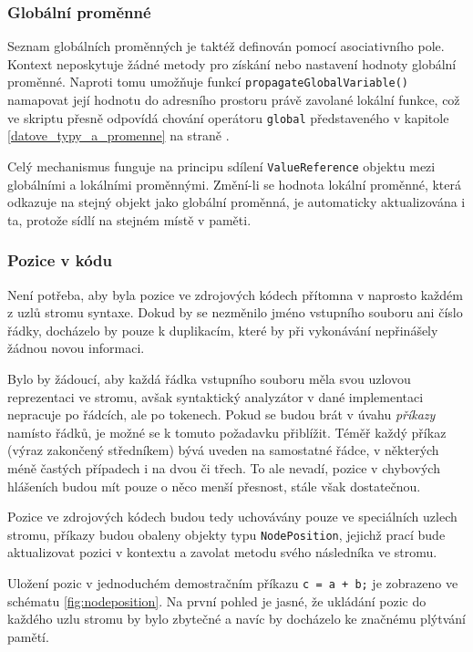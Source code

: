 \documentclass[11pt,twoside,a4paper]{book}
\begin{document}
\subsubsection{Globální proměnné}

Seznam globálních proměnných je taktéž definován pomocí asociativního pole. Kontext neposkytuje žádné metody pro získání nebo nastavení hodnoty globální proměnné. Naproti tomu umožňuje funkcí \texttt{propagateGlobalVariable()} namapovat její hodnotu do adresního prostoru právě zavolané lokální funkce, což ve skriptu přesně odpovídá chování operátoru \texttt{global} představeného v kapitole \ref{datove_typy_a_promenne} na straně \pageref{datove_typy_a_promenne}.

Celý mechanismus funguje na principu sdílení \texttt{ValueReference} objektu mezi globálními a lo\-kál\-ní\-mi proměnnými. Změní-li se hodnota lokální proměnné, která odkazuje na stejný objekt jako globální proměnná, je automaticky aktualizována i ta, protože sídlí na stejném místě v paměti.


\subsubsection{Pozice v kódu}
\label{pozice_v_kodu}

Není potřeba, aby byla pozice ve zdrojových kódech přítomna v naprosto každém z uzlů stromu syntaxe. Dokud by se nezměnilo jméno vstupního souboru ani číslo řádky, docházelo by pouze k duplikacím, které by při vykonávání nepřinášely žádnou novou informaci.

Bylo by žádoucí, aby každá řádka vstupního souboru měla svou uzlovou reprezentaci ve stromu, avšak syntaktický analyzátor v dané implementaci nepracuje po řádcích, ale po tokenech. Pokud se budou brát v úvahu \textit{příkazy} namísto řádků, je možné se k tomuto požadavku přiblížit. Téměř každý příkaz (výraz zakončený středníkem) bývá uveden na samostatné řádce, v některých méně častých případech i na dvou či třech. To ale nevadí, pozice v chybových hlášeních budou mít pouze o něco menší přesnost, stále však dostatečnou.

Pozice ve zdrojových kódech budou tedy uchovávány pouze ve speciálních uzlech stromu, příkazy budou obaleny objekty typu \texttt{NodePosition}, jejichž prací bude aktualizovat pozici v kontextu a zavolat metodu svého ná\-sled\-ní\-ka ve stromu.

Uložení pozic v jednoduchém demostračním příkazu \texttt{c = a + b;} je zobrazeno ve schématu \ref{fig:nodeposition}. Na první pohled je jasné, že ukládání pozic do každého uzlu stromu by bylo zbytečné a navíc by docházelo ke značnému plýtvání pamětí.
\end{document}
